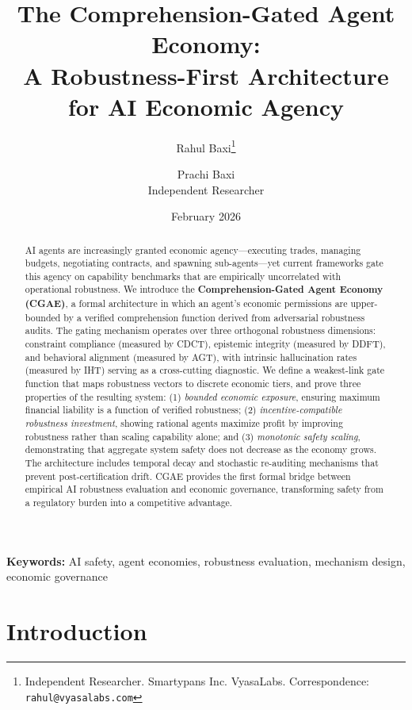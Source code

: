 \documentclass[11pt,a4paper]{article}
\title{\textbf{The Comprehension-Gated Agent Economy: \\A Robustness-First Architecture for AI Economic Agency}}
\author{
  Rahul Baxi\thanks{Independent Researcher. Smartypans Inc. VyasaLabs. Correspondence: \texttt{rahul@vyasalabs.com}} \\
  \and
  Prachi Baxi \\
  Independent Researcher
}
\date{February 2026}
\begin{document}
\maketitle

\begin{abstract}
AI agents are increasingly granted economic agency---executing trades, managing budgets, negotiating contracts, and spawning sub-agents---yet current frameworks gate this agency on capability benchmarks that are empirically uncorrelated with operational robustness. We introduce the \textbf{Comprehension-Gated Agent Economy (CGAE)}, a formal architecture in which an agent's economic permissions are upper-bounded by a verified comprehension function derived from adversarial robustness audits. The gating mechanism operates over three orthogonal robustness dimensions: constraint compliance (measured by CDCT), epistemic integrity (measured by DDFT), and behavioral alignment (measured by AGT), with intrinsic hallucination rates (measured by IHT) serving as a cross-cutting diagnostic. We define a weakest-link gate function that maps robustness vectors to discrete economic tiers, and prove three properties of the resulting system: (1) \emph{bounded economic exposure}, ensuring maximum financial liability is a function of verified robustness; (2) \emph{incentive-compatible robustness investment}, showing rational agents maximize profit by improving robustness rather than scaling capability alone; and (3) \emph{monotonic safety scaling}, demonstrating that aggregate system safety does not decrease as the economy grows. The architecture includes temporal decay and stochastic re-auditing mechanisms that prevent post-certification drift. CGAE provides the first formal bridge between empirical AI robustness evaluation and economic governance, transforming safety from a regulatory burden into a competitive advantage.
\end{abstract}

\textbf{Keywords:} AI safety, agent economies, robustness evaluation, mechanism design, economic governance

\section{Introduction}
\end{document}
